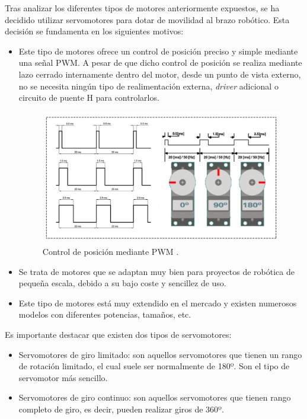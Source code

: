Tras analizar los diferentes tipos de motores anteriormente expuestos, se ha decidido utilizar servomotores para dotar de movilidad al brazo robótico. Esta decisión se fundamenta en los siguientes motivos:
\begin{itemize}
    \item Este tipo de motores ofrece un control de posición preciso y simple mediante una señal \ac{PWM}. A pesar de que dicho control de posición se realiza mediante lazo cerrado internamente dentro del motor, desde un punto de vista externo, no se necesita ningún tipo de realimentación externa, \textit{driver} adicional o circuito de puente H para controlarlos.
    
    \begin{figure}[h!]
    \centering 
    \includegraphics[width=.6\linewidth]{pictures/Senal_PWM.jpg}
    \caption{Control de posición mediante PWM \cite{ZonaMakerServomotores}.}
    \label{fig:}
    \end{figure}

    
    \item Se trata de motores que se adaptan muy bien para proyectos de robótica de pequeña escala, debido a su bajo coste y sencillez de uso.
    
    \item Este tipo de motores está muy extendido en el mercado y existen numerosos modelos con diferentes potencias, tamaños, etc.
\end{itemize}

Es importante destacar que existen dos tipos de servomotores:
\begin{itemize}
    \item Servomotores de giro limitado: son aquellos servomotores que tienen un rango de rotación limitado, el cual suele ser normalmente de 180º. Son el tipo de servomotor más sencillo.
    \item Servomotores de giro continuo: son aquellos servomotores que tienen rango completo de giro, es decir, pueden realizar giros de 360º.
\end{itemize}

